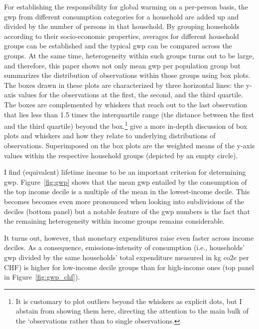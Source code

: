 \documentclass[referee, lineno, pdflatex,sn-apa]{sn-jnl}%
\theoremstyle{thmstyleone}%
\theoremstyle{thmstyletwo}%
\theoremstyle{thmstylethree}%
\begin{document}
For establishing the responsibility for global warming on a per-person basis, the \ac{gwp} from different consumption categories for a household are added up and divided by the number of persons in that household.
By grouping households according to their socio-economic properties, averages for different household groups can be established and the typical \ac{gwp} can be compared across the groups.
At the same time, heterogeneity within such groups turns out to be large, and therefore, this paper shows not only mean \ac{gwp} per population group but summarizes the distribution of observations within those groups using box plots.
The boxes drawn in these plots are characterized by three horizontal lines: the y-axis values for the observations at the first, the second, and the third quartile.
The boxes are complemented by whiskers that reach out to the last observation that lies less than 1.5 times the interquartile range (the distance between the first and the third quartile) beyond the box.\footnote{%
  It is customary to plot outliers beyond the whiskers as explicit dots, but I abstain from showing them here, directing the attention to the main bulk of the `observations rather than to single observations.}
\citet{krzywinski_visualizing_2014} give a more in-depth discussion of box plots and whiskers and how they relate to underlying distributions of observations.
Superimposed on the box plots are the weighted means of the y-axis values within the respective household groups (depicted by an empty circle).

I find (equivalent) lifetime income to be an important criterion for determining \ac{gwp}.
Figure~\ref{fig:gwp} shows that the mean \ac{gwp} entailed by the consumption of the top income decile is a multiple of the mean in the lowest-income decile.
This becomes becomes even more pronounced when looking into subdivisions of the deciles (bottom panel) but a notable feature of the \ac{gwp} numbers is the fact that the remaining heterogeneity within income groups remains considerable.

It turns out, however, that monetary expenditures raise even faster across income deciles.
As a consequence, emissions-intensity of consumption (i.e., households' \ac{gwp} divided by the same households' total expenditure measured in kg \ac{co2e} per CHF) is higher for low-income decile groups than for high-income ones (top panel in Figure~\ref{fig:gwp_chf}).
\end{document}
